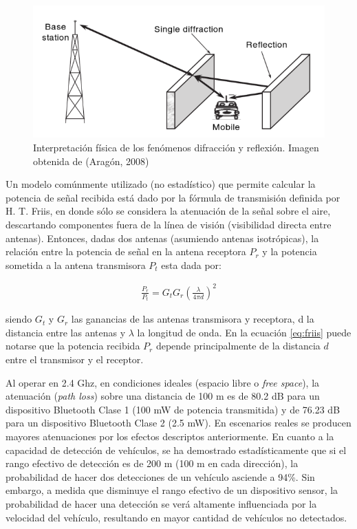 \begin{figure}[!htp]
\centering
\captionsetup{width=.7\linewidth}
\includegraphics[scale=0.6]{images/difraccion-reflexion.png}
\caption{Interpretación física de los fenómenos difracción y reflexión. Imagen obtenida de (Aragón, 2008)}
\label{fig:shadowing}
\end{figure}

Un modelo comúnmente utilizado (no estadístico) que permite calcular la potencia de señal recibida está dado por la fórmula de transmisión definida por H. T. Friis, en donde sólo se considera la atenuación de la señal sobre el aire, descartando componentes fuera de la línea de visión (visibilidad directa entre antenas). Entonces, dadas dos antenas (asumiendo antenas isotrópicas), la relación entre la potencia de señal en la antena receptora $P_r$ y la potencia sometida a la antena transmisora $P_t$ esta dada por:

\begin{align}\label{eq:friis}
\frac{P_r}{P_t}=G_tG_r\left (\frac{\lambda}{4\pi d} \right)^2
\end{align}

siendo $G_t$ y $G_r$ las ganancias de las antenas transmisora y receptora, d la distancia entre las antenas y $\lambda$ la longitud de onda. En la ecuación \ref{eq:friis} puede notarse que la potencia recibida $P_r$ depende principalmente de la distancia $d$ entre el transmisor y el receptor. 

Al operar en 2.4 Ghz, en condiciones ideales (espacio libre o \textit{free space}), la atenuación (\textit{path loss})  sobre una distancia de 100 m es de 80.2 dB para un dispositivo Bluetooth Clase 1 (100 mW de potencia transmitida) y de 76.23 dB para un dispositivo Bluetooth Clase 2 (2.5 mW). En escenarios reales se producen mayores atenuaciones por los efectos descriptos anteriormente. En cuanto a la capacidad de detección de vehículos, se ha demostrado estadísticamente\cite{bakula2011probabilistic} que si el rango efectivo de detección es de 200 m (100 m en cada dirección), la probabilidad de hacer dos detecciones de un vehículo asciende a 94\%.  Sin embargo, a medida que disminuye el rango efectivo de un dispositivo sensor, la probabilidad de hacer una detección se verá altamente influenciada por la velocidad del vehículo, resultando en mayor cantidad de vehículos no detectados. 

